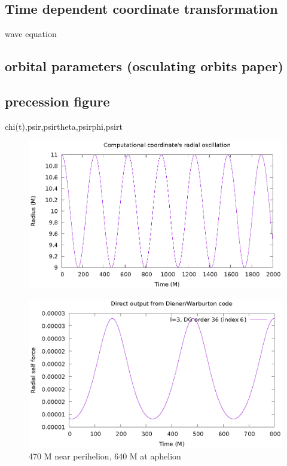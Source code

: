 \subsection{Time dependent coordinate transformation}
wave equation

\subsection{orbital parameters (osculating orbits paper)}
\subsection{precession figure}
chi(t),psir,psirtheta,psirphi,psirt

\begin{figure}
\includegraphics{orbit}
\end{figure}




\begin{figure}
  \includegraphics{psirl_l3_order36}
  \caption{470 M near perihelion, 640 M at aphelion}
\end{figure}

